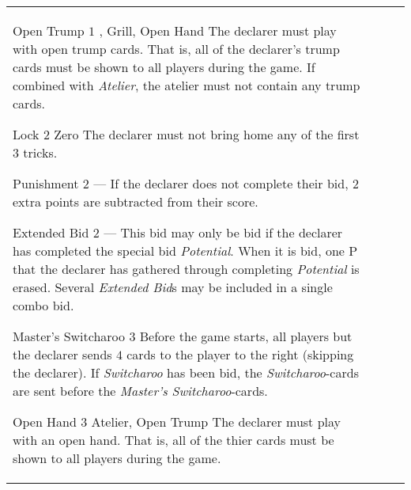 \begin{table}
\begin{center}
\begin{tabularx}{\textwidth}{lcp{3cm}|X}
			\specialBidItem%
			{Open Trump}
			{$1$}
			{\nonTrump, Grill, Open Hand}
			{%
				The declarer must play with open trump cards. That is, all of the declarer’s trump cards must be shown to all players during the game. If combined with \emph{Atelier}, the atelier must not contain any trump cards.
			}

			\specialBidItem%
			{Lock}
			{$2$}
			{Zero}
			{%
				The declarer must not bring home any of the first $3$ tricks.
			}

			\specialBidItem%
			{Punishment}
			{$2$}
			{---}
			{%
				If the declarer does not complete their bid, $2$ extra points are subtracted from their score.
			}

			\specialBidItem%
			{Extended Bid}
			{$2$}
			{---}
			{%
				This bid may only be bid if the declarer has completed the special bid \emph{Potential}. When it is bid, one P that the declarer has gathered through completing \emph{Potential} is erased. Several \emph{Extended Bid}s may be included in a single combo bid.
			}

			\specialBidItem%
			{Master's Switcharoo}
			{$3$}
			{\nonTrump}
			{%
				Before the game starts, all players but the declarer sends $4$ cards to the player to the right (skipping the declarer). If \emph{Switcharoo} has been bid, the \emph{Switcharoo}-cards are sent before the \emph{Master's Switcharoo}-cards.
			}

			\specialBidItem%
			{Open Hand}
			{$3$}
			{Atelier, Open Trump}
			{%
				The declarer must play with an open hand. That is, all of the thier cards must be shown to all players during the game.
			}
		\end{tabularx}
	\end{center}
\end{table}
